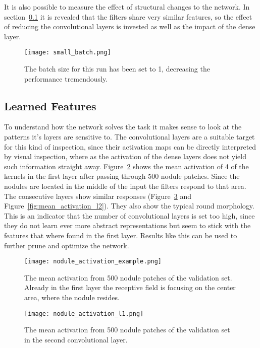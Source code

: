 \documentclass[main.tex]{subfiles}
\begin{document}
It is also possible to measure the effect of structural changes to the network. In section~\ref{ss:features} it is revealed that the filters share very similar features, so the effect of reducing the convolutional layers is invested as well as the impact of the dense layer.

\begin{figure}[H]
\begin{center}
\texttt{[image: small\_batch.png]}
\end{center}
\caption{The batch size for this run has been set to 1, decreasing the performance tremendously.}
\label{fig:small_batch}
\end{figure}


\subsection{Learned Features}\label{ss:features}
To understand how the network solves the task it makes sense to look at the patterns it's layers are sensitive to. The convolutional layers are a suitable target for this kind of inspection, since their activation maps can be directly interpreted by visual inspection, where as the activation of the dense layers does not yield such information straight away. Figure~\ref{fig:mean_activation} shows the mean activation of 4 of the kernels in the first layer after passing through 500 nodule patches. Since the nodules are located in the middle of the input the filters respond to that area. The consecutive layers show similar responses (Figure~\ref{fig:mean_activation_l1} and Figure~\ref{fig:mean_activation_l2}). They also show the typical round morphology. This is an indicator that the number of convolutional layers is set too high, since they do not learn ever more abstract representations but seem to stick with the features that where found in the first layer. Results like this can be used to further prune and optimize the network.


\begin{figure}[H]
\begin{center}
\texttt{[image: nodule\_activation\_example.png]}
\end{center}
\caption{The mean activation from 500 nodule patches of the validation set. Already in the first layer the receptive field is focusing on the center area, where the nodule resides.}
\label{fig:mean_activation}
\end{figure}

\begin{figure}
\begin{center}
\texttt{[image: nodule\_activation\_l1.png]}
\end{center}
\caption{The mean activation from 500 nodule patches of the validation set in the second convolutional layer.}
\label{fig:mean_activation_l1}
\end{figure}
\end{document}
